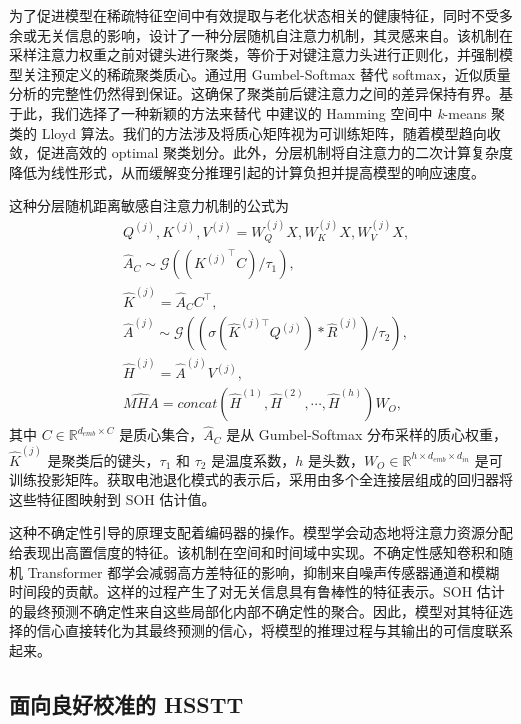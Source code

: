 \documentclass[UTF8,journal,twoside,web]{ieeecolor}
\newcommand{\newtext}[1]{{\leavevmode\color{blue}#1}}
\begin{document}
为了促进模型在稀疏特征空间中有效提取与老化状态相关的健康特征，同时不受多余或无关信息的影响，设计了一种分层随机自注意力机制，其灵感来自\cite{clustered_attention_vyas2020fast}。该机制在采样注意力权重之前对键头进行聚类，等价于对键注意力头进行正则化，并强制模型关注预定义的稀疏聚类质心。通过用 Gumbel-Softmax 替代 softmax，近似质量分析的完整性仍然得到保证。这确保了聚类前后键注意力之间的差异保持有界。基于此，我们选择了一种新颖的方法来替代\cite{clustered_attention_vyas2020fast} 中建议的 Hamming 空间中 \textit{k}-means 聚类的 Lloyd 算法。我们的方法涉及将质心矩阵视为可训练矩阵，随着模型趋向收敛，促进高效的 optimal 聚类划分。此外，分层机制将自注意力的二次计算复杂度降低为线性形式\cite{clustered_attention_vyas2020fast}，从而缓解变分推理引起的计算负担并提高模型的响应速度。

这种分层随机距离敏感自注意力机制的公式为
\begin{align}
\label{eq:attention_kqv} & Q^{(j)}, K^{(j)}, V^{(j)} = W_{Q}^{(j)}X, W_{K}^{(j)}X, W_{V}^{(j)}X, \\
\label{eq:hsstt_k} & \hat{A}_{C} \sim \mathcal{G}(({K^{(j)}}^\top C) / \tau_{1}), \\
\label{eq:hsstt_clustered_k} & \hat{K}^{(j)} = \hat{A}_{C}C^\top, \\
\label{eq:hsstt_hierarchical_attention} & \hat{A}^{(j)} \sim \mathcal{G}((\sigma(\hat{K}^{(j)\top} Q^{(j)})*\hat{R}^{(j)}) / \tau_{2}), \\
\label{eq:hsstt} & \hat{H}^{({j})}=\hat{A}^{({j})}V^{{(j)}}, \\
\label{eq:hsstt_mha} & \widehat{MHA}=concat(\hat{H}^{(1)},\hat{H}^{(2)},\cdots,\hat{H}^{(h)})W_{O},
\end{align}%
其中 $C \in \mathbb{R}^{d_{emb}\times C}$ 是质心集合，$\hat{A}_{C}$ 是从 Gumbel-Softmax 分布采样的质心权重，$\hat{K}^{(j)}$ 是聚类后的键头，$\tau_{1}$ 和 $\tau_{2}$ 是温度系数，$h$ 是头数，$W_{O} \in \mathbb{R}^{h \times d_{emb} \times d_{in}}$ 是可训练投影矩阵。获取电池退化模式的表示后，采用由多个全连接层组成的回归器将这些特征图映射到 SOH 估计值。

\newtext{这种不确定性引导的原理支配着编码器的操作。模型学会动态地将注意力资源分配给表现出高置信度的特征。该机制在空间和时间域中实现。不确定性感知卷积和随机 Transformer 都学会减弱高方差特征的影响，抑制来自噪声传感器通道和模糊时间段的贡献。这样的过程产生了对无关信息具有鲁棒性的特征表示。SOH 估计的最终预测不确定性来自这些局部化内部不确定性的聚合。因此，模型对其特征选择的信心直接转化为其最终预测的信心，将模型的推理过程与其输出的可信度联系起来。}

\subsection{面向良好校准的 HSSTT}\label{subsec:uncertainty_calibration}
\end{document}
